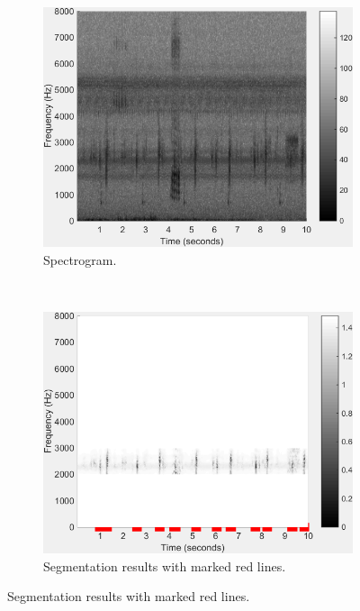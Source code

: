 \begin{figure}[htb!]
\centering
        \begin{subfigure}[b]{0.5\textwidth}
                \includegraphics[width=\textwidth]{image/Ch5/spectrogram.png}
                \caption{Spectrogram.}
        \end{subfigure}%
        \\ 
        \begin{subfigure}[b]{0.5\textwidth}
                \includegraphics[width=\textwidth]{image/Ch5/segmentation.png}
                \caption{Segmentation results with marked red lines.}
        \end{subfigure}

\end{figure}
